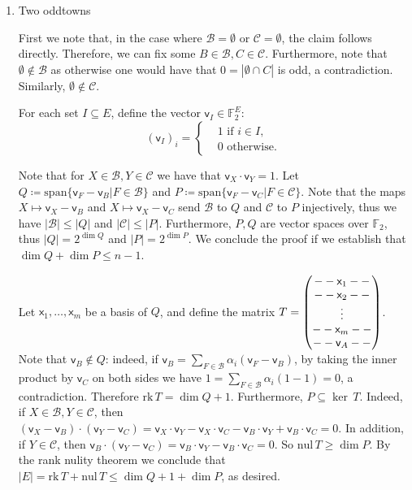 \documentclass[kulak]{tplt}
\theoremstyle{definition}
\newcommand{\F}{\mathbb{F}}
\newcommand{\vv}{\mathsf{v}}
\newcommand{\vx}{\mathsf{x}}
\newcommand{\spn}{\mathrm{span}}
\newcommand{\rk}{\mathrm{rk}}
\newcommand{\nul}{\mathrm{nul}}
\begin{document}
\begin{enumerate}
\item Two oddtowns

First we note that, in the case where $\mathcal B = \emptyset $ or $\mathcal C = \emptyset$, the claim follows directly.
Therefore, we can fix some $B \in \mathcal B, C \in \mathcal C$.
Furthermore, note that $\emptyset \not\in\mathcal B$ as otherwise one would have that $ 0 = |\emptyset \cap C|$ is odd, a contradiction.
Similarly, $\emptyset \not\in \mathcal C$.

For each set $I \subseteq E$, define the vector $\vv_I \in \F_2^E$:
$$ (\vv_I)_i =\begin{cases*}
      & 1 \text{ if $i \in I$,}\\
      & 0 \text{ otherwise.}
    \end{cases*} $$

Note that for $X \in \mathcal B,  Y \in \mathcal C$ we have that $\vv_X \cdot \vv_Y = 1$.
Let $Q \coloneqq \spn \{ \vv_F - \vv_B  | F \in \mathcal B \} $ and $P \coloneqq \spn \{ \vv_F - \vv_C  | F \in \mathcal C \} $.
Note that the maps $X \mapsto \vv_X - \vv_B$ and $X \mapsto \vv_X - \vv_C$ send $\mathcal B $ to $Q$ and $\mathcal C $ to $P$ injectively, thus we have $|\mathcal B| \leq |Q|$ and $|\mathcal C | \leq |P|$.
Furthermore, $P, Q$ are vector spaces over $\F_2$, thus $|Q| = 2^{\dim Q}$ and $|P| = 2^{\dim P}$.
We conclude the proof if we establish that $\dim Q + \dim P  \leq n - 1$.

Let $\vx_1, \ldots, \vx_m$ be a basis of $Q$, and define the matrix $T = \begin{pmatrix}
 \-- \-- \vx_1 \--\-- \\  \--\--  \vx_2 \-- \--\\ \vdots \\  \-- \-- \vx_m \--\-- \\  \--\--  \vv_A \--\--
\end{pmatrix}$.
Note that $\vv_B \not\in Q$: indeed, if $\vv_B = \sum_{F \in \mathcal B} \alpha_i (\vv_F - \vv_B)$, by taking the inner product by $\vv_C$ on both sides we have $1 = \sum_{F \in \mathcal B} \alpha_i (1 - 1) = 0$, a contradiction.
Therefore $\rk\, T = \dim Q + 1$.
Furthermore, $P \subseteq \ker \, T$.
Indeed, if $X \in \mathcal B,  Y \in \mathcal C$, then $(\vv_X - \vv_B)\cdot (\vv_Y - \vv_C) = \vv_X\cdot \vv_Y - \vv_X\cdot \vv_C - \vv_B\cdot \vv_Y + \vv_B\cdot \vv_C = 0$.
In addition, if $Y \in \mathcal C$, then $\vv_B\cdot (\vv_Y - \vv_C) = \vv_B\cdot \vv_Y - \vv_B\cdot \vv_C = 0$.
So $\nul\, T \geq \dim P$.
By the rank nulity theorem we conclude that $|E| = \rk \, T  + \nul \, T \leq \dim Q + 1 + \dim P$, as desired.



\end{enumerate}
\end{document}
